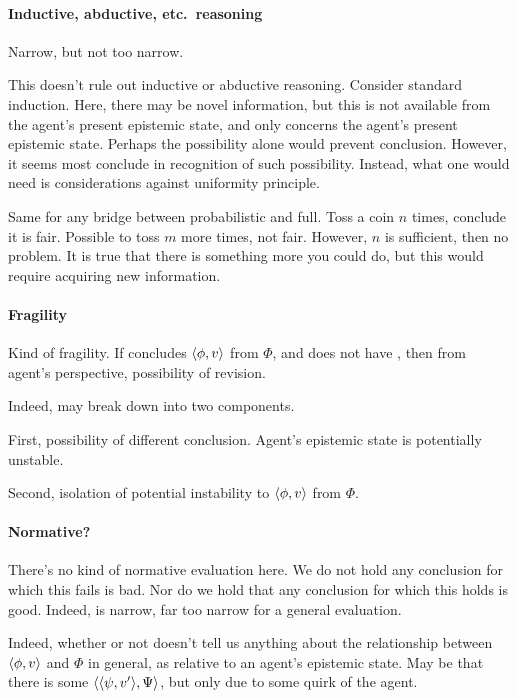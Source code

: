 \paragraph*{Inductive, abductive, etc.\ reasoning}

\begin{note}
  Narrow, but not too narrow.
\end{note}

\begin{note}
  This doesn't rule out inductive or abductive reasoning.
  Consider standard induction.
  Here, there may be novel information, but this is not available from the agent's present epistemic state, and \qzS{} only concerns the agent's present epistemic state.
  Perhaps the possibility alone would prevent conclusion.
  However, it seems most conclude in recognition of such possibility.
  Instead, what one would need is considerations against uniformity principle.

  Same for any bridge between probabilistic and full.
  Toss a coin \(n\) times, conclude it is fair.
  Possible to toss \(m\) more times, not fair.
  However, \(n\) is sufficient, then no problem.
  It is true that there is something more you could do, but this would require acquiring new information.
\end{note}



\paragraph*{Fragility}

\begin{note}
  Kind of fragility.
  If concludes \(\langle \phi, v \rangle\) from \(\Phi\), and does not have \zS{}, then from agent's perspective, possibility of revision.

  Indeed, may break down into two components.

  First, possibility of different conclusion.
  Agent's epistemic state is potentially unstable.

  Second, isolation of potential instability to \(\langle \phi, v \rangle\) from \(\Phi\).
\end{note}


\paragraph*{Normative?}

\begin{note}
  There's no kind of normative evaluation here.
  We do not hold any conclusion for which this fails is bad.
  Nor do we hold that any conclusion for which this holds is good.
  Indeed, \zS{} is narrow, far too narrow for a general evaluation.

  Indeed, whether or not \zS{} doesn't tell us anything about the relationship between \(\langle \phi, v \rangle\) and \(\Phi\) in general, as relative to an agent's epistemic state.
  May be that there is some \(\langle \langle \psi, v' \rangle, \Psi \rangle\), but only due to some quirk of the agent.
\end{note}

